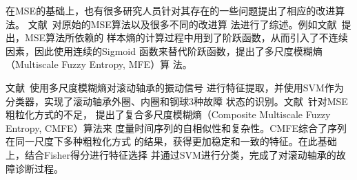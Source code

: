 在MSE的基础上，也有很多研究人员针对其存在的一些问题提出了相应的改进算法。
文献~对原始的MSE算法以及很多不同的改进算
法进行了综述。例如文献~提出，MSE算法所依赖的
样本熵的计算过程中用到了阶跃函数，从而引入了不连续因素，因此使用连续的Sigmoid
函数来替代阶跃函数，提出了多尺度模糊熵（Multiscale Fuzzy Entropy, MFE）算
法。

文献~使用多尺度模糊熵对滚动轴承的振动信号
进行特征提取，并使用SVM作为分类器，实现了滚动轴承外圈、内圈和钢球3种故障
状态的识别。文献~针对MSE粗粒化方式的不足，
提出了复合多尺度模糊熵（Composite Multiscale Fuzzy Entropy, CMFE）算法来
度量时间序列的自相似性和复杂性。CMFE综合了序列在同一尺度下多种粗粒化方式
的结果，获得更加稳定和一致的特征。在此基础上，结合Fisher得分进行特征选择
并通过SVM进行分类，完成了对滚动轴承的故障诊断过程。

